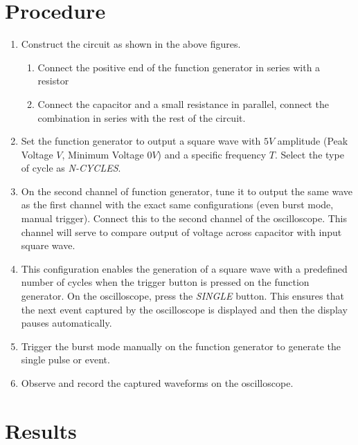 \documentclass[12pt,a4paper]{article}
\begin{document}
\section*{Procedure}
\begin{enumerate}
    \item Construct the circuit as shown in the above figures.
    \begin{enumerate}
        \item Connect the positive end of the function generator in series with a resistor
        \item Connect the capacitor and a small resistance in parallel, connect the combination in series with the rest of the circuit.
    \end{enumerate}
    \item Set the function generator to output a square wave with $5V$ amplitude (Peak Voltage $V$, Minimum Voltage $0V$) and a specific frequency $T$.
    Select the type of cycle as \textit{N-CYCLES}.
    \item On the second channel of function generator, tune it to output the same wave as the first channel with the exact same configurations (even burst mode, manual trigger). Connect this to the second channel of the oscilloscope. This channel will serve to compare output of voltage across capacitor with input square wave.
    \item This configuration enables the generation of a square wave with a predefined number of cycles when the trigger button is pressed on the function generator.
    On the oscilloscope, press the \textit{SINGLE} button. This ensures that the next event captured by the oscilloscope is displayed and then the display pauses automatically.
    \item Trigger the burst mode manually on the function generator to generate the single pulse or event.
    \item Observe and record the captured waveforms on the oscilloscope.
\end{enumerate}

\section*{Results}
\end{document}
